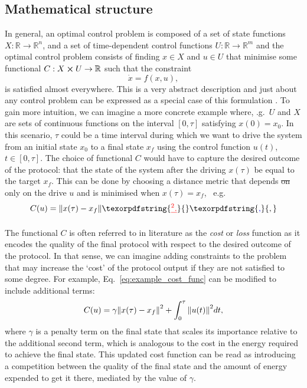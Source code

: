 \documentclass[a4paper,oneside,11pt]{book}
\newcommand{\R}{\mathbb{R}}
\providecommand{\DIFaddtex}[1]{{\protect\color{blue}\uwave{#1}}} %
\providecommand{\DIFdeltex}[1]{{\protect\color{red}\sout{#1}}}                      %
\providecommand{\DIFaddbegin}{} %
\providecommand{\DIFaddend}{} %
\providecommand{\DIFdelbegin}{} %
\providecommand{\DIFdelend}{} %
\providecommand{\DIFadd}[1]{\texorpdfstring{\DIFaddtex{#1}}{#1}} %
\providecommand{\DIFdel}[1]{\texorpdfstring{\DIFdeltex{#1}}{}} %
\newcommand{\DIFscaledelfig}{0.5}
\newlength{\DIFdelgraphicswidth} %
\newlength{\DIFdelgraphicsheight} %
\newcommand{\DIFaddincludegraphics}[2][]{{\color{blue}\fbox{\DIFOincludegraphics[#1]{#2}}}} %
\newcommand{\DIFdelincludegraphics}[2][]{%
\sbox{\DIFdelgraphicsbox}{\DIFOincludegraphics[#1]{#2}}%
\settoboxwidth{\DIFdelgraphicswidth}{\DIFdelgraphicsbox} %
\settoboxtotalheight{\DIFdelgraphicsheight}{\DIFdelgraphicsbox} %
\scalebox{\DIFscaledelfig}{%
\parbox[b]{\DIFdelgraphicswidth}{\usebox{\DIFdelgraphicsbox}\\[-\baselineskip] \rule{\DIFdelgraphicswidth}{0em}}\llap{\resizebox{\DIFdelgraphicswidth}{\DIFdelgraphicsheight}{%
\setlength{\unitlength}{\DIFdelgraphicswidth}%
\begin{picture}(1,1)%
\thicklines\linethickness{2pt} %
{\color[rgb]{1,0,0}\put(0,0){\framebox(1,1){}}}%
{\color[rgb]{1,0,0}\put(0,0){\line( 1,1){1}}}%
{\color[rgb]{1,0,0}\put(0,1){\line(1,-1){1}}}%
\end{picture}%
}\hspace*{3pt}}} %
} %
\DeclareRobustCommand{\DIFaddbegin}{\DIFOaddbegin \let\includegraphics\DIFaddincludegraphics} %
\DeclareRobustCommand{\DIFaddend}{\DIFOaddend \let\includegraphics\DIFOincludegraphics} %
\DeclareRobustCommand{\DIFdelbegin}{\DIFOdelbegin \let\includegraphics\DIFdelincludegraphics} %
\DeclareRobustCommand{\DIFdelend}{\DIFOaddend \let\includegraphics\DIFOincludegraphics} %
\begin{document}
\subsection{Mathematical structure}\label{sec:3.1.1_mathematical_structure}

In general, an optimal control problem is composed of a set of state functions $X: \R \rightarrow \R^n$, and a set of time-dependent control functions $U:\R \rightarrow \R^m$ and the optimal control problem consists of finding $x \in X$ and $u \in U$ that minimise some functional $C: X \cross U \rightarrow \R$ such that the constraint
\begin{equation}\label{eq:control_ODE}
    \dot{x} = f(x, u),
\end{equation}
is satisfied almost everywhere. This is a very abstract description and just about any control problem can be expressed as a special case of this formulation \cite{dalessandro_introduction_2021}. To gain more intuition, we can imagine a more concrete example where, \@e.g.~$U$ and $X$ are sets of continuous functions on the interval $[0, \tau]$ satisfying $x(0) = x_0$. In this scenario, $\tau$ could be a time interval during which we want to drive the system from an initial state $x_0$ to a final state $x_f$ using the control function $u(t)$, $t \in [0, \tau]$. The choice of functional $C$ would have to capture the desired outcome of the protocol: that the state of the system after the driving $x(\tau)$ be equal to the target $x_f$. This can be done by choosing a distance metric that depends \DIFdelbegin \DIFdel{on }\DIFdelend only on the drive $u$ and is minimised when $x(\tau) = x_f$, \@~e.g.
\begin{equation}\label{eq:example_cost_func}
    C(u) = \norm{x(\tau)  - x_f}\DIFdelbegin \DIFdel{^2.
}\DIFdelend \DIFaddbegin \DIFadd{,
}\DIFaddend \end{equation}
\DIFaddbegin \DIFadd{where $\norm{\cdot}$ represents some norm on the space $X$.
}

	\DIFaddend The functional $C$ is often referred to in literature as the \emph{cost} or \emph{loss} function \cite{wald_statistical_1950} as it encodes the quality of the final protocol with respect to the desired outcome of the protocol. In that sense, we can imagine adding constraints to the problem that may increase the `cost' of the protocol output if they are not satisfied to some degree. For example, Eq.~\eqref{eq:example_cost_func} can be modified to include additional terms:
\begin{equation}\label{eq:example_cost_func2}
    C(u) = \gamma \norm{x(\tau)  - x_f}^2 + \int_0^{\tau} \norm{u(t)}^2 dt,
\end{equation}
where $\gamma$ is a penalty term on the final state that scales its importance relative to the additional second term, which is analogous to the cost in the energy required to achieve the final state. This updated cost function can be read as introducing a competition between the quality of the final state and the amount of energy expended to get it there, mediated by the value of $\gamma$. 
\end{document}
